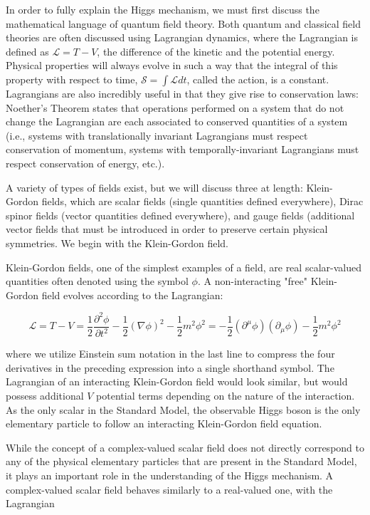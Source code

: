 In order to fully explain the Higgs mechanism, we must first discuss the mathematical language of quantum field theory. Both quantum and classical field theories are often discussed using Lagrangian dynamics, where the Lagrangian is defined as  $\mathcal{L} = T - V$, the difference of the kinetic and the potential energy. Physical properties will always evolve in such a way that the integral of this property with respect to time, $\mathcal{S} = \int \mathcal{L} dt$, called the action, is a constant. Lagrangians are also incredibly useful in that they give rise to conservation laws: Noether's Theorem states that operations performed on a system that do not change the Lagrangian are each associated to conserved quantities of a system (i.e., systems with translationally invariant Lagrangians must respect conservation of momentum, systems with temporally-invariant Lagrangians must respect conservation of energy, etc.).

A variety of types of fields exist, but we will discuss three at length: Klein-Gordon fields, which are scalar fields (single quantities defined everywhere), Dirac spinor fields (vector quantities defined everywhere), and gauge fields (additional vector fields that must be introduced in order to preserve certain physical symmetries. We begin with the Klein-Gordon field.

Klein-Gordon fields, one of the simplest examples of a field, are real scalar-valued quantities often denoted using the symbol $\phi$. A non-interacting "free" Klein-Gordon field evolves according to the Lagrangian:

\begin{equation}
\mathcal{L} = T - V 
=\frac{1}{2} \frac{\partial^{2} \phi}{\partial t^{2}} - \frac{1}{2} (\nabla \phi)^{2} - \frac{1}{2} m^{2} \phi^{2}
=-\frac{1}{2}(\partial^{\mu}\phi)(\partial_{\mu}\phi)- \frac{1}{2} m^{2} \phi^{2}
\end{equation}

where we utilize Einstein sum notation in the last line to compress the four derivatives in the preceding expression into a single shorthand symbol. The Lagrangian of an interacting Klein-Gordon field would look similar, but would possess additional $V$ potential terms depending on the nature of the interaction. As the only scalar in the Standard Model, the observable Higgs boson is the only elementary particle to follow an interacting Klein-Gordon field equation.

While the concept of a complex-valued scalar field does not directly correspond to any of the physical elementary particles that are present in the Standard Model, it plays an important role in the understanding of the Higgs mechanism. A complex-valued scalar field behaves similarly to a real-valued one, with the Lagrangian

